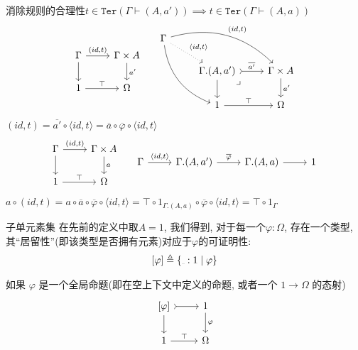 \documentclass[aspectratio=169,xcolor=dvipsnames]{beamer}
\newcommand\Ter{\mathtt{Ter}}
\newcommand{\ul}{{\scalebox{0.4}[0.4]{\_}}}
\begin{document}
\begin{frame}{消除规则的合理性$t\in\Ter(\Gamma\vdash(A,a'))\implies t\in\Ter(\Gamma\vdash(A,a))$}
    \[
  \begin{tabular}[t]{lr}
  \begin{tikzcd}
    \Gamma \arrow[r,"{(id,t)}"] \arrow[d] & \Gamma\times A \arrow[d,"a'"] \\
    1 \arrow[r,"\top"] & \Omega
  \end{tikzcd}
&
  \begin{tikzcd}
\Gamma
\arrow[drr, bend left, "{(id,t)}"]
\arrow[ddr, bend right]
\arrow[dr, dotted, "{\langle id,t\rangle}"] & & \\
& \Gamma.(A,a') \arrow[dr,phantom,"{\lrcorner}",very near start] \arrow[r,tail,"{\overline{a'}}"] \arrow[d]
& \Gamma\times A \arrow[d, "a'"] \\
& 1 \arrow[r, "\top"]
& \Omega
\end{tikzcd}
  \end{tabular} \]
  $(id,t) = \overline{a'}\circ\langle id,t\rangle = \overline{a}\circ\overline{\varphi}\circ\langle id,t\rangle$
  \[
  \begin{tabular}{cc}
    \begin{tikzcd}
    \Gamma \arrow[r,"{(id,t)}"] \arrow[d] & \Gamma\times A \arrow[d,"a"] \\
    1 \arrow[r,"\top"] & \Omega
  \end{tikzcd}
  &
  \begin{tikzcd}
  \Gamma\arrow[r,"{\langle id,t\rangle}"] & \Gamma.(A,a')\arrow[r,"{\overline{\varphi}}"] & \Gamma.(A,a) \arrow[r] & 1
  \end{tikzcd}
\end{tabular}
  \]
  $a\circ(id,t)=a\circ\overline{a}\circ\overline{\varphi}\circ\langle id,t\rangle=\top\circ1_{\Gamma.(A,a)}\circ\overline{\varphi}\circ\langle id,t\rangle = \top\circ1_{\Gamma}$
\end{frame}

\begin{frame}{子单元素集}
  在先前的定义中取$A=1$, 我们得到, 对于每一个$\varphi:\Omega$, 存在一个类型, 其“居留性”(即该类型是否拥有元素)对应于$\varphi$的可证明性:
  \[ [\varphi]\triangleq \{\ul:1\mid\varphi\} \]

  如果 $φ$ 是一个全局命题(即在空上下文中定义的命题, 或者一个 $1 → Ω$ 的态射)
  \[
  \begin{tikzcd}
    {[\varphi]} \arrow[r,tail] \arrow[d] & 1 \arrow[d,"\varphi"] \\
    1 \arrow[r,"\top"] & \Omega
  \end{tikzcd}
  \]
\end{frame}
\end{document}
